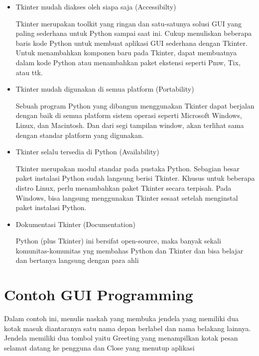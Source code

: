 \begin{itemize}
\item Tkinter mudah diakses oleh siapa saja (Accessibilty)

Tkinter merupakan toolkit yang ringan dan satu-satunya solusi GUI yang paling sederhana untuk Python sampai saat ini. Cukup menuliskan beberapa baris kode Python untuk membuat aplikasi GUI sederhana dengan Tkinter. Untuk menambahkan komponen baru pada Tkinter, dapat membuatnya dalam kode Python atau menambahkan paket ekstensi seperti Pmw, Tix, atau ttk. 
\item Tkinter mudah digunakan di semua platform (Portability)

Sebuah program Python yang dibangun menggunakan Tkinter dapat berjalan dengan baik di semua platform sistem operasi seperti Microsoft Windows, Linux, dan Macintosh. Dan dari segi tampilan window, akan terlihat sama dengan standar platform yang digunakan. 
 
\item Tkinter selalu tersedia di Python (Availability)

Tkinter merupakan modul standar pada pustaka Python. Sebagian besar paket instalasi Python sudah langsung berisi Tkinter. Khusus untuk beberapa distro Linux, perlu menambahkan paket Tkinter secara terpisah. Pada Windows, bisa langsung menggunakan Tkinter sesaat setelah menginstal paket instalasi Python. 
 
\item Dokumentasi Tkinter (Documentation)

Python (plus Tkinter) ini bersifat open-source, maka banyak sekali komunitas-komunitas yng membahas Python dan Tkinter dan bisa belajar dan bertanya langsung dengan para ahli
\end{itemize}

\section{Contoh GUI Programming}
\hspace*{0.5in} Dalam contoh ini, menulis naskah yang membuka jendela yang memiliki dua kotak masuk diantaranya satu nama depan berlabel dan nama belakang lainnya. Jendela memiliki dua tombol yaitu Greeting yang menampilkan kotak pesan selamat datang ke pengguna dan Close yang menutup aplikasi

